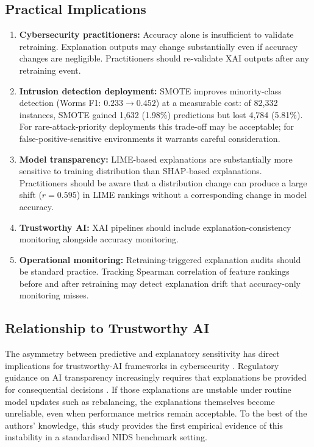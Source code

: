 \documentclass[conference,a4paper]{IEEEtran}
\newcommand{\NIDS}{NIDS\xspace}
\newcommand{\SMOTE}{SMOTE\xspace}
\newcommand{\XAI}{XAI\xspace}
\begin{document}
\subsection{Practical Implications}

\begin{enumerate}
  \item \textbf{Cybersecurity practitioners:} Accuracy alone is insufficient to
        validate retraining. Explanation outputs may change substantially even if
        accuracy changes are negligible. Practitioners should re-validate \XAI
        outputs after any retraining event.
  \item \textbf{Intrusion detection deployment:} \SMOTE improves minority-class
        detection (Worms F1: $0.233\to0.452$) at a measurable cost: of 82,332
        instances, \SMOTE gained 1,632 (1.98\%) predictions but lost 4,784
        (5.81\%). For rare-attack-priority deployments this trade-off may be
        acceptable; for false-positive-sensitive environments it warrants careful
        consideration.
  \item \textbf{Model transparency:} LIME-based explanations are substantially
        more sensitive to training distribution than SHAP-based explanations.
        Practitioners should be aware that a distribution change can produce a
        large shift ($r=0.595$) in LIME rankings without a corresponding change
        in model accuracy.
  \item \textbf{Trustworthy AI:} \XAI pipelines should include
        explanation-consistency monitoring alongside accuracy monitoring.
  \item \textbf{Operational monitoring:} Retraining-triggered explanation audits
        should be standard practice. Tracking Spearman correlation of feature
        rankings before and after retraining may detect explanation drift that
        accuracy-only monitoring misses.
\end{enumerate}

\subsection{Relationship to Trustworthy AI}

The asymmetry between predictive and explanatory sensitivity has direct implications
for trustworthy-AI frameworks in cybersecurity \cite{charmet2022,rjoub2023}.
Regulatory guidance on AI transparency increasingly requires that explanations be
provided for consequential decisions \cite{euaiact2024}. If those explanations are
unstable under routine model updates such as rebalancing, the explanations
themselves become unreliable, even when performance metrics remain acceptable.
To the best of the authors' knowledge, this study provides the first empirical
evidence of this instability in a standardised \NIDS benchmark setting.
\end{document}
